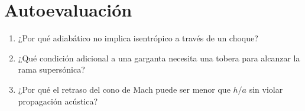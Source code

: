 \section{Autoevaluación}
\begin{enumerate}
\item ¿Por qué adiabático no implica isentrópico a través de un choque?
\item ¿Qué condición adicional a una garganta necesita una tobera para alcanzar la rama supersónica?
\item ¿Por qué el retraso del cono de Mach puede ser menor que $h/a$ sin violar propagación acústica?
\end{enumerate}

